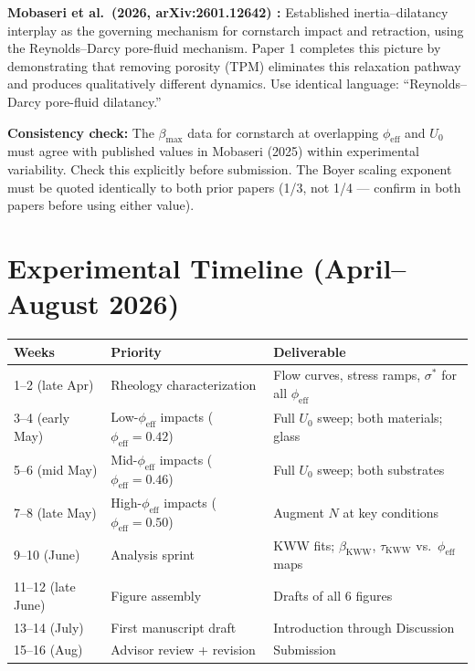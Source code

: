 \documentclass[11pt,letterpaper]{article}
\newcommand{\phieff}{\phi_{\mathrm{eff}}}
\newcommand{\taukww}{\tau_{\mathrm{KWW}}}
\newcommand{\betamax}{\beta_{\max}}
\newcommand{\bkww}{\beta_{\mathrm{KWW}}}
\newcommand{\sigstar}{\sigma^*}
\begin{document}
\textbf{Mobaseri et al.\ (2026, arXiv:2601.12642) \cite{Mobaseri2026}:}
Established inertia--dilatancy interplay as the governing mechanism for
cornstarch impact and retraction, using the Reynolds--Darcy pore-fluid
mechanism. Paper 1 completes this picture by demonstrating that removing
porosity (TPM) eliminates this relaxation pathway and produces
qualitatively different dynamics. Use identical language: ``Reynolds--Darcy
pore-fluid dilatancy.''

\begin{cautionbox}
\textbf{Consistency check:} The $\betamax$ data for cornstarch at overlapping
$\phieff$ and $U_0$ must agree with published values in Mobaseri (2025)
within experimental variability. Check this explicitly before submission.
The Boyer scaling exponent must be quoted identically to both prior papers
(1/3, not 1/4 --- confirm in both papers before using either value).
\end{cautionbox}

\section{Experimental Timeline (April--August 2026)}

\begin{center}
\begin{tabular}{lll}
  \toprule
  Weeks & Priority & Deliverable \\
  \midrule
  1--2 (late Apr) & Rheology characterization &
    Flow curves, stress ramps, $\sigstar$ for all $\phieff$ \\
  3--4 (early May) & Low-$\phieff$ impacts ($\phieff = 0.42$) &
    Full $U_0$ sweep; both materials; glass \\
  5--6 (mid May) & Mid-$\phieff$ impacts ($\phieff = 0.46$) &
    Full $U_0$ sweep; both substrates \\
  7--8 (late May) & High-$\phieff$ impacts ($\phieff = 0.50$) &
    Augment $N$ at key conditions \\
  9--10 (June) & Analysis sprint &
    KWW fits; $\bkww$, $\taukww$ vs.\ $\phieff$ maps \\
  11--12 (late June) & Figure assembly &
    Drafts of all 6 figures \\
  13--14 (July) & First manuscript draft &
    Introduction through Discussion \\
  15--16 (Aug) & Advisor review + revision &
    Submission \\
  \bottomrule
\end{tabular}
\end{center}
\end{document}
